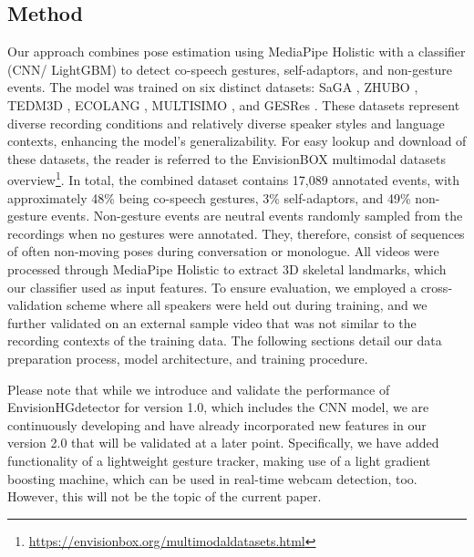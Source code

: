 \documentclass[11pt,smallheadings,cleardoublepage=empty,tocflat,numbers=noenddot,twoside,captions=tableheading]{scrbook}
\begin{document}
\begin{refsection}
\section{Method}
\label{sec:methodology}
Our approach combines pose estimation using MediaPipe Holistic with a classifier (CNN/ LightGBM) to detect co-speech gestures, self-adaptors, and non-gesture events. The model was trained on six distinct datasets: SaGA \parencite{luckingBielefeldSpeechGesture2010}, ZHUBO \parencite{baoEditableCoSpeechGesture2024}, TEDM3D \parencite{rohrerTemporalPragmaticAnalysis2022}, ECOLANG \parencite{guECOLANGMultimodalCorpus2025}, MULTISIMO \parencite{koutsombogeraModelingCollaborativeMultimodal2018}, and GESRes  \parencite{hensel2025richly}. These datasets represent diverse recording conditions and relatively diverse speaker styles and language contexts, enhancing the model's generalizability. For easy lookup and download of these datasets, the reader is referred to the EnvisionBOX multimodal datasets overview\footnote{\url{https://envisionbox.org/multimodaldatasets.html}}. {\color{blue} In total, the combined dataset contains 17,089 annotated events, with approximately 48\% being co-speech gestures, 3\% self-adaptors, and 49\% non-gesture events}. Non-gesture events are neutral events randomly sampled from the recordings when no gestures were annotated. They, therefore, consist of sequences of often non-moving poses during conversation or monologue. All videos were processed through MediaPipe Holistic to extract 3D skeletal landmarks, which our classifier used as input features. To ensure evaluation, we employed a cross-validation scheme where all speakers were held out during training, and we further validated on an external sample video that was not similar to the recording contexts of the training data. The following sections detail our data preparation process, model architecture, and training procedure.

{\color{red} Please note that while we introduce and validate the performance of EnvisionHGdetector for version 1.0, which includes the CNN model, we are continuously developing and have already incorporated new features in our version 2.0 that will be validated at a later point. Specifically, we have added functionality of a lightweight gesture tracker, making use of a light gradient boosting machine, which can be used in real-time webcam detection, too. However, this will not be the topic of the current paper.}


\end{refsection}
\end{document}
